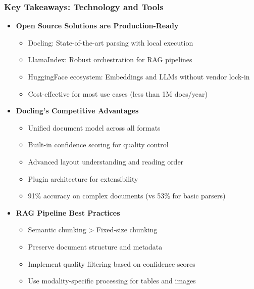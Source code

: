\begin{frame}[fragile]\frametitle{Key Takeaways: Technology and Tools}
      \begin{itemize}
        \item \textbf{Open Source Solutions are Production-Ready}
        \begin{itemize}
            \item Docling: State-of-the-art parsing with local execution
            \item LlamaIndex: Robust orchestration for RAG pipelines
            \item HuggingFace ecosystem: Embeddings and LLMs without vendor lock-in
            \item Cost-effective for most use cases (less than 1M docs/year)
        \end{itemize}
        \item \textbf{Docling's Competitive Advantages}
        \begin{itemize}
            \item Unified document model across all formats
            \item Built-in confidence scoring for quality control
            \item Advanced layout understanding and reading order
            \item Plugin architecture for extensibility
            \item 91\% accuracy on complex documents (vs 53\% for basic parsers)
        \end{itemize}
        \item \textbf{RAG Pipeline Best Practices}
        \begin{itemize}
            \item Semantic chunking > Fixed-size chunking
            \item Preserve document structure and metadata
            \item Implement quality filtering based on confidence scores
            \item Use modality-specific processing for tables and images
        \end{itemize}
      \end{itemize}
\end{frame}

